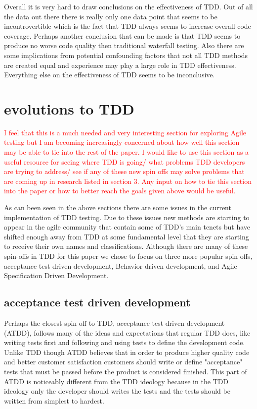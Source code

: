 \documentclass{sig-alternate}
\newcommand{\mycomment}[1]{\textcolor{red}{#1}}
\begin{document}
Overall it is very hard to draw conclusions on the effectiveness of TDD. Out of all the data out there there is really only one data point that seems to be incontrovertible which is the fact that TDD always seems to increase overall code coverage.  Perhaps another conclusion that can be made is that TDD seems to produce no worse code quality then traditional waterfall testing.  Also there are some implications from potential confounding factors that not all TDD methods are created equal and experience may play a large role in TDD effectiveness. Everything else on the effectiveness of TDD seems to be inconclusive.
\section{evolutions to TDD}
\mycomment{I feel that this is a much needed and very interesting section for exploring Agile testing but I am becoming increasingly concerned about how well this section may be able to tie into the rest of the paper. I would like to use this section as a useful resource for seeing where TDD is going/ what problems TDD developers are trying to address/ see if any of these new spin offs may solve problems that are coming up in research listed in section 3. Any input on how to tie this section into the paper or how to better reach the goals given above would be useful.}

As can been seen in the above sections there are some issues in the current implementation of TDD testing.  Due to these issues new methods are starting to appear in the agile community that contain some of TDD's main tenets but have shifted enough away from TDD at some fundamental level that they are starting to receive their own names and classifications.  Although there are many of these spin-offs in TDD for this paper we chose to focus on three more popular spin offs, acceptance test driven development, Behavior driven development, and Agile Specification Driven Development.

\subsection{acceptance test driven development}

Perhaps the closest spin off to TDD, acceptance test driven development (ATDD), follows many of the ideas and expectations that regular TDD does, like writing tests first and following and using tests to define the development code.  Unlike TDD though ATDD believes that in order to produce higher quality code and better customer satisfaction customers should write or define "acceptance" tests that must be passed before the product is considered finished.  This part of ATDD is noticeably different from the TDD ideology because in the TDD ideology only the developer should writes the tests and the tests should be written from simplest to hardest.~\cite{Hammond:2012}
\end{document}
